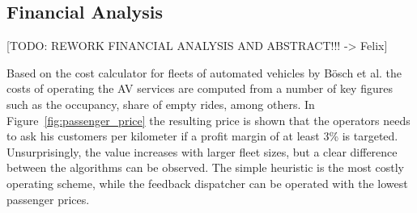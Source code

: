 \subsection{Financial Analysis}
\label{sec:cost_analysis}

[TODO: REWORK FINANCIAL ANALYSIS AND ABSTRACT!!! -> Felix]



Based on the cost calculator for fleets of automated vehicles by Bösch et al. \cite{Bosch2016a}
 the costs of operating the AV services are computed from a number of key figures
 such as the occupancy, share of empty rides, among others. In Figure~\ref{fig:passenger_price}
 the resulting price is shown that the operators needs to ask his customers per
 kilometer if a profit margin of at least 3\% is targeted. Unsurprisingly, the value
  increases with larger fleet sizes, but a clear difference
between the algorithms can be observed. The simple heuristic is the most
costly operating scheme, while the feedback dispatcher can be operated with the
lowest passenger prices.


\captionsetup[subfigure]{width=0.9\textwidth}

